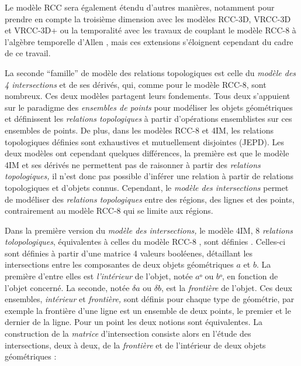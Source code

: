 Le modèle RCC sera également étendu d'autres manières, notamment pour
prendre en compte la troisième dimension avec les modèles RCC-3D,
VRCC-3D et VRCC-3D+ ou la temporalité avec les travaux de
\textcite{XXX} couplant le modèle RCC-8 à l'algèbre temporelle d'Allen
\autocite{Sabharwal2011}, mais ces extensions s'éloignent cependant du
cadre de ce travail.

La seconde \enquote{famille} de modèle des relations topologiques est
celle du \emph{modèle des 4 intersections}
\autocite[4IM,][]{Egenhofer1989} et de ses dérivés, qui, comme pour le
modèle RCC-8, sont nombreux. Ces deux modèles partagent leurs
fondements. Tous deux s’appuient sur le paradigme des \emph{ensembles
  de points} pour modéliser les objets géométriques et définissent les
\emph{relations topologiques} à partir d'opérations ensemblistes sur
ces ensembles de points. De plus, dans les modèles RCC-8
\autocite{Randell1992} et 4IM, les relations topologiques définies
sont exhaustives et mutuellement disjointes (JEPD). Les deux modèles
ont cependant quelques différences, la première est que le modèle 4IM
et ses dérivés ne permettent pas de raisonner à partir des
\emph{relations topologiques,} il n'est donc pas possible d'inférer
une relation à partir de relations topologiques et d'objets
connus. Cependant, le \emph{modèle des intersections} permet de
modéliser des \emph{relations topologiques} entre des régions, des
lignes et des points, contrairement au modèle RCC-8 qui se limite aux
régions.

Dans la première version du \emph{modèle des intersections,} le modèle
4IM, 8 \emph{relations tolopologiques}, équivalentes à celles du
modèle RCC-8 \autocite{Duchene2019}, sont définies
\textcite{Egenhofer1989,Egenhofer1990,Egenhofer1991a}. Celles-ci sont
définies à partir d'une matrice 4 valeurs booléenes, détaillant les
intersections entre les composantes de deux objets géométriques \(a\)
et \(b\). La première d'entre elles est \emph{l'intérieur} de l'objet,
notée \(aᵒ\) ou \(bᵒ\), en fonction de l'objet concerné. La seconde,
notée \(δa\) ou \(δb\), est la \emph{frontière} de l'objet. Ces deux
ensembles, \emph{intérieur} et \emph{frontière,} sont définis pour
chaque type de géométrie, par exemple la frontière d'une ligne est un
ensemble de deux points, le premier et le dernier de la ligne. Pour un
point les deux notions sont équivalentes. La construction de la
\emph{matrice }d'intersection consiste alors en l'étude des
intersections, deux à deux, de la \emph{frontière} et de l'intérieur
de deux objets géométriques :

